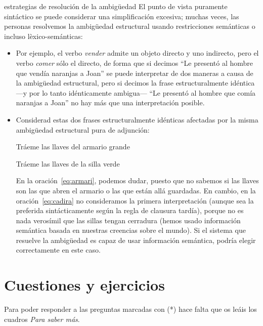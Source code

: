 \begin{persabermes}{estrategias de resolución de la ambigüedad}
El punto de vista puramente sintáctico se puede considerar una simplificación excesiva; muchas veces, las personas resolvemos la ambigüedad estructural usando restricciones semánticas o incluso lèxico-semánticas: \begin{itemize} \item Por ejemplo, el verbo \emph{vender} admite un objeto directo y uno indirecto, pero el verbo \emph{comer} sólo el directo, de forma que si decimos ``Le presentó al hombre que vendía naranjas a Joan'' se puede interpretar de dos maneras a causa de la ambigüedad estructural, pero si decimos la frase estructuralmente idéntica ---y por lo tanto idénticamente ambigua--- ``Le presentó al hombre que comía naranjas a Joan'' no hay más que una interpretación posible. \item Considerad estas dos frases estructuralmente idénticas afectadas por la misma ambigüedad estructural pura de adjunción: \begin{exemple} \label{eq:armari} Tráeme las llaves del armario grande \end{exemple} \begin{exemple} \label{eq:cadira} Tráeme las llaves de la silla verde \end{exemple} En la oración~\ref{eq:armari}, podemos dudar, puesto que no sabemos si las llaves son las que abren el armario o las que están allá guardadas. En cambio, en la oración~\ref{eq:cadira} no consideramos la primera interpretación (aunque sea la preferida sintácticamente según la regla de clausura tardía), porque no es nada verosímil que las sillas tengan cerradura (hemos usado información semántica basada en nuestras creencias sobre el mundo). Si el sistema que resuelve la ambigüedad es capaz de usar información semántica, podría elegir correctamente en este caso. \end{itemize} \end{persabermes} 

\section{Cuestiones y ejercicios} Para poder responder a las preguntas marcadas con (*) hace falta que os leáis los cuadros \emph{Para saber más}. 

